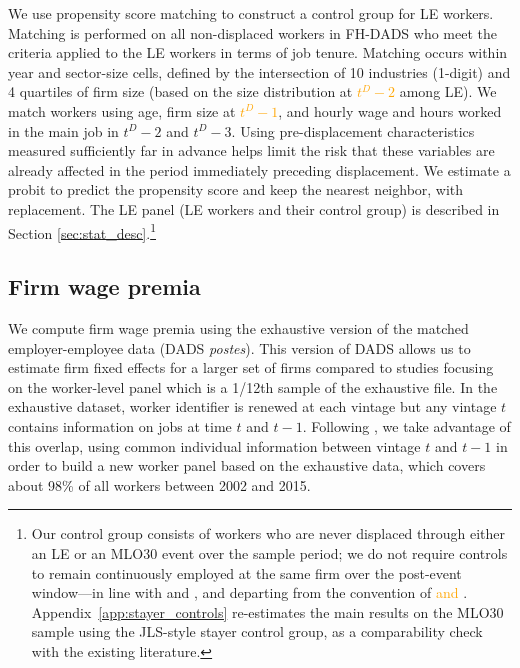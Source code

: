 We use propensity score matching to construct a control group for LE workers. Matching is performed on all non-displaced workers in FH-DADS who meet the criteria applied to the LE workers in terms of job tenure. %
Matching occurs within year and sector-size cells, defined by the intersection of 10 industries (1-digit) and 4 quartiles of firm size (based on the size distribution at \textcolor{orange}{$t^D-2$} among LE). We match workers using age, firm size at \textcolor{orange}{$t^D-1$}, and hourly wage and hours worked in the main job in $t^D-2$ and $t^D-3$. Using pre-displacement characteristics measured sufficiently far in advance helps limit the risk that these variables are already affected in the period immediately preceding displacement. We estimate a probit to predict the propensity score and keep the nearest neighbor, with replacement. The LE panel (LE workers and their control group) is described in Section \ref{sec:stat_desc}.\footnote{Our control group consists of workers who are never displaced through either an LE or an MLO30 event over the sample period; we do not require controls to remain continuously employed at the same firm over the post-event window---in line with \citet{Schmieder2020} and \citet{bertheau_etal_2023}, and departing from the convention of \citet{Jacobson1993} \textcolor{orange}{and \citet{Lachowska2020}}. Appendix~\ref{app:stayer_controls} re-estimates the main results on the MLO30 sample using the JLS-style stayer control group, as a comparability check with the existing literature.}

\subsection{Firm wage premia}
\label{sec:data:firm:premium} 

We compute firm wage premia using the exhaustive version of the matched employer-employee data (DADS \textit{postes}). This version of DADS allows us to estimate firm fixed effects for a larger set of firms compared to studies focusing on the worker-level panel \citep[e.g.][]{Abowd1999,bertheau_etal_2023} which is a 1/12th sample of the exhaustive file. In the exhaustive dataset, worker identifier is renewed at each vintage but any vintage $t$ contains information on jobs at time $t$ and $t-1$. Following \cite{godechot2023akm}, we take advantage of this overlap, using common individual information between vintage $t$ and $t-1$ in order to build a new worker panel based on the exhaustive data, which covers about 98\% of all workers between 2002 and 2015.


